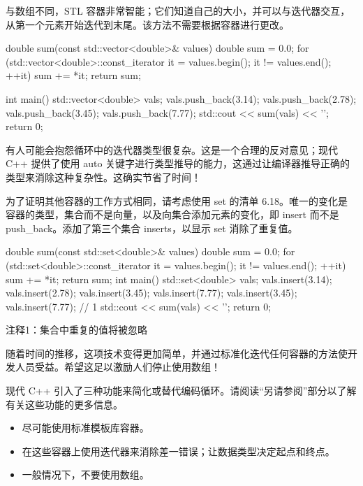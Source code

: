 与数组不同，STL 容器非常智能；它们知道自己的大小，并可以与迭代器交互，从第一个元素开始迭代到末尾。该方法不需要根据容器进行更改。


\begin{cpp}
double sum(const std::vector<double>& values) {
  double sum = 0.0;
  for (std::vector<double>::const_iterator it = values.begin();
      it != values.end(); ++it)
    sum += *it;
  return sum;
}

int main() {
  std::vector<double> vals;
  vals.push_back(3.14); vals.push_back(2.78);
  vals.push_back(3.45); vals.push_back(7.77);
  std::cout << sum(vals) << '\n';
  return 0;
}
\end{cpp}

有人可能会抱怨循环中的迭代器类型很复杂。这是一个合理的反对意见；现代 C++ 提供了使用 auto 关键字进行类型推导的能力，这通过让编译器推导正确的类型来消除这种复杂性。这确实节省了时间！

为了证明其他容器的工作方式相同，请考虑使用 set 的清单 6.18。唯一的变化是容器的类型，集合而不是向量，以及向集合添加元素的变化，即 insert 而不是 push\_back。添加了第三个集合 inserts，以显示 set 消除了重复值。


\begin{cpp}
double sum(const std::set<double>& values) {
  double sum = 0.0;
  for (std::set<double>::const_iterator it = values.begin();
      it != values.end(); ++it)
    sum += *it;
  return sum;
}
int main() {
  std::set<double> vals;
  vals.insert(3.14); vals.insert(2.78);
  vals.insert(3.45); vals.insert(7.77);
  vals.insert(3.45); vals.insert(7.77); // 1
  std::cout << sum(vals) << '\n';
  return 0;
}
\end{cpp}

{\footnotesize
注释1：集合中重复的值将被忽略
}

随着时间的推移，这项技术变得更加简单，并通过标准化迭代任何容器的方法使开发人员受益。希望这足以激励人们停止使用数组！

现代 C++ 引入了三种功能来简化或替代编码循环。请阅读“另请参阅”部分以了解有关这些功能的更多信息。


\begin{itemize}
\item
尽可能使用标准模板库容器。

\item
在这些容器上使用迭代器来消除差一错误；让数据类型决定起点和终点。

\item
一般情况下，不要使用数组。
\end{itemize}

